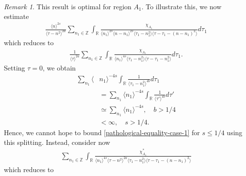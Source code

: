 \documentclass[12pt,reqno]{amsart}
\numberwithin{equation}{section}  %
\numberwithin{figure}{section}
\newcommand{\rr}{\mathbb{R}}
\newcommand{\zz}{\mathbb{Z}}
\theoremstyle{plain}
\theoremstyle{definition}
\theoremstyle{remark}
\newtheorem{remark}{Remark}
\begin{document}
\begin{framed}
\begin{remark}
This result is optimal for region $A_{1}$. To illustrate this, we now estimate
%
%
\begin{equation*}
  \begin{split}
     \frac{ \langle n
    \rangle ^{2s}}{\langle \tau - n^{2} \rangle ^{2a}}
    \sum_{n_{1} \in \zz} \int_{\rr} \frac{\chi_{A_{1}}}{ \langle n_{1} \rangle ^{2s} \langle n-n_{1} \rangle ^{2s} 
    \langle \tau_{1} - n_{1}^{2} \rangle \langle  \tau - \tau_{1} -
    (n - n_{1})^{2} \rangle }
    d \tau_1 
  \end{split}
\end{equation*}
which reduces to 
\begin{equation}
  \label{pathological-equality-case-1}
  \begin{split}
    \frac{ 1}{\langle \tau \rangle ^{2a}}
    \sum_{n_{1} \in \zz} \int_{\rr} \frac{\chi_{A_{1}}}{ \langle n_{1} \rangle ^{4s}
    \langle \tau_{1} - n_{1}^{2} \rangle \langle  \tau - \tau_{1} -
    n_{1}^{2} \rangle }
    d \tau_1.
  \end{split}
\end{equation}
%
%
%
%
Setting $\tau = 0$, we obtain
%
%
%
\begin{equation*}
\begin{split}
   \sum_{n_{1}} \langle & n_{1}\rangle ^{-4s} \int_{\rr} \frac{1}{\langle
   \tau_{1} - n_{1}^{2} \rangle ^{4b}}d \tau_{1}
   \\
   & = \sum_{n_{1}} \langle
  n_{1}\rangle ^{-4s} \int_{\rr} \frac{1}{\langle
   \tau' \rangle ^{4b}}d \tau'
   \\
   & \simeq \sum_{n_{1}} \langle n_{1} \rangle ^{-4s}, \quad b > 1/4
   \\
   & < \infty, \quad s > 1/4.
\end{split}
\end{equation*}
%
Hence, we cannot hope to bound \eqref{pathological-equality-case-1} for $s \le
1/4$ using this splitting. Instead, consider now
%
%
\begin{equation*}
\begin{split}
  \sum_{n_{1} \in \zz} \int_{\rr} \frac{\chi^{*}_{A_{1}}}{\langle n_{1} \rangle
  ^{4s} \langle \tau - n^{2} \rangle ^{2a} \langle \tau_{1} - n_{1}^{2} \rangle
   \langle \tau - \tau_{1} - (n - n_{1})^{2} \rangle }
\end{split}
\end{equation*}
%
%
which reduces to 
\begin{equation*}

\end{equation*}
\end{remark}
\end{framed}
\end{document}
